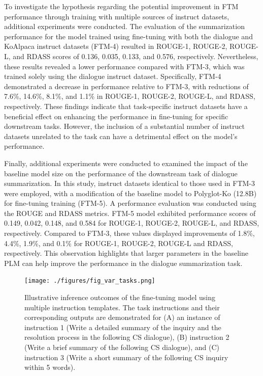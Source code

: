 \documentclass[sigconf]{acmart}
\begin{document}
To investigate the hypothesis regarding the potential improvement in FTM performance through training with multiple sources of instruct datasets, additional experiments were conducted. The evaluation of the summarization performance for the model trained using fine-tuning with both the dialogue and KoAlpaca instruct datasets (FTM-4) resulted in ROUGE-1, ROUGE-2, ROUGE-L, and RDASS scores of 0.136,   0.035, 0.133, and 0.576, respectively. Nevertheless, these results revealed a lower performance compared with FTM-3, which was trained solely using the dialogue instruct dataset. Specifically, FTM-4 demonstrated a decrease in performance relative to FTM-3, with reductions of 7.6\%, 14.6\%, 8.1\%, and 1.1\% in ROUGE-1, ROUGE-2, ROUGE-L, and RDASS, respectively. These findings indicate that task-specific instruct datasets have a beneficial effect on enhancing the performance in fine-tuning for specific downstream tasks. However, the inclusion of a substantial number of instruct datasets unrelated to the task can have a detrimental effect on the model's performance.


Finally, additional experiments were conducted to examined the impact of the baseline model size on the performance of the downstream task of dialogue summarization. In this study, instruct datasets identical to those used in FTM-3 were employed, with a modification of the baseline model to Polyglot-Ko (12.8B) for fine-tuning training (FTM-5). A performance evaluation was conducted using the ROUGE and RDASS metrics. FTM-5 model exhibited performance scores of 0.149, 0.042, 0.148, and 0.584 for ROUGE-1, ROUGE-2, ROUGE-L, and RDASS, respectively. Compared to FTM-3, these values displayed improvements of 1.8\%, 4.4\%, 1.9\%, and 0.1\% for ROUGE-1, ROUGE-2, ROUGE-L and RDASS, respectively. This observation highlights that larger parameters in the baseline PLM can help improve the performance in the dialogue summarization task. 




\begin{figure}[t!]
  \centering
  \texttt{[image: ./figures/fig\_var\_tasks.png]}
  \caption{Illustrative inference outcomes of the fine-tuning model using multiple instruction templates. The task instructions and their corresponding outputs are demonstrated for (A) an instance of instruction 1 (Write a detailed summary of the inquiry and the resolution process in the following CS dialogue), (B) instruction 2 (Write a brief summary of the following CS dialogue), and (C) instruction 3 (Write a short summary of the following CS inquiry within 5 words). 
  }
\label{fig_var_tasks}
\end{figure}
\end{document}
